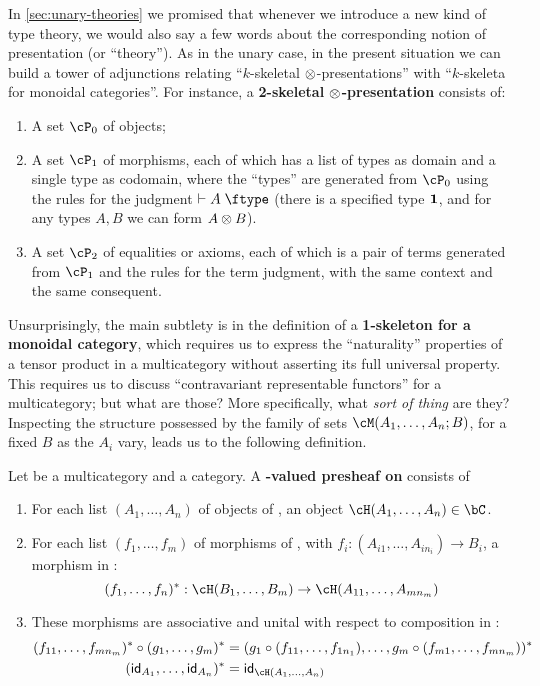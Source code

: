In \cref{sec:unary-theories} we promised that whenever we introduce a new kind of type theory, we would also say a few words about the corresponding notion of presentation (or ``theory'').
As in the unary case, in the present situation we can build a tower of adjunctions relating ``$k$-skeletal $\otimes$-presentations'' with ``$k$-skeleta for monoidal categories''.
For instance, a \textbf{2-skeletal $\otimes$-presentation} consists of:
\begin{enumerate}
\item A set $\cP_0$ of objects;
\item A set $\cP_1$ of morphisms, each of which has a list of types as domain and a single type as codomain, where the ``types'' are generated from $\cP_0$ using the rules for the judgment $\types A\type$ (there is a specified type $\mathbf{1}$, and for any types $A,B$ we can form $A\otimes B$).
\item A set $\cP_2$ of equalities or axioms, each of which is a pair of terms generated from $\cP_1$ and the rules for the term judgment, with the same context and the same consequent.
\end{enumerate}

Unsurprisingly, the main subtlety is in the definition of a \textbf{1-skeleton for a monoidal category}, which requires us to express the ``naturality'' properties of a tensor product in a multicategory without asserting its full universal property.
This requires us to discuss ``contravariant representable functors'' for a multicategory; but what are those?
More specifically, what \emph{sort of thing} are they?
Inspecting the structure possessed by the family of sets $\cM(A_1,\dots,A_n;B)$, for a fixed $B$ as the $A_i$ vary, leads us to the following definition.

\begin{defn}\label{defn:multicat-pshf}
  Let \cM be a multicategory and \bC a category.
  A \textbf{\bC-valued presheaf on \cM} consists of
  \begin{enumerate}
  \item For each list $(A_1,\dots,A_n)$ of objects of \cM, an object $\cH(A_1,\dots,A_n)\in\bC$.
  \item For each list $(f_1,\dots,f_m)$ of morphisms of \cM, with $f_i:(A_{i1},\dots,A_{in_i})\to B_i$, a morphism in \bC:
    \[ (f_1,\dots,f_n)^* : \cH(B_1,\dots,B_m) \to \cH(A_{11},\dots,A_{mn_m}) \]
  \item These morphisms are associative and unital with respect to composition in \cM:
    \begin{align*}
      (f_{11},\dots,f_{mn_m})^* \circ (g_1,\dots,g_m)^* &=
      (g_1\circ (f_{11},\dots,f_{1n_1}), \dots, g_m \circ (f_{m1},\dots,f_{mn_m}))^*
      \\
      (\idfunc_{A_1},\dots,\idfunc_{A_n})^* &= \idfunc_{\cH(A_1,\dots,A_n)}
    \end{align*}
  \end{enumerate}
\end{defn}

